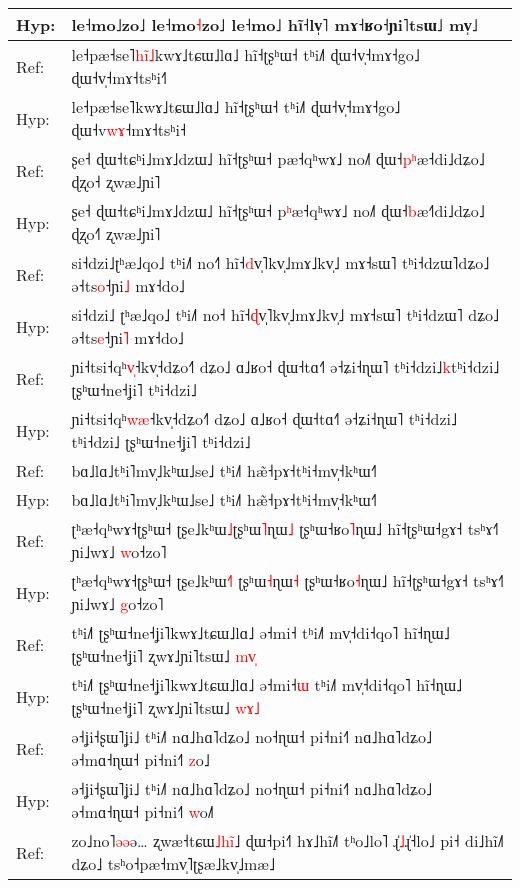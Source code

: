 \documentclass[10pt]{article}
\DeclareRobustCommand{\hl}[1]{{\textcolor{red}{#1}}}
\begin{document}
\begin{longtable}{ll}
Hyp: & le˧mo˩zo˩ le˧mo\hl{˧}zo˩ le˧mo˩ hĩ˧lv̩˥ mɤ˧ʁo˧ɲi˥tsɯ˩ mv̩˩ \\ 
\midrule 
Ref: & le˧pæ˧se˥\hl{h}\hl{i}\hl{̃}\hl{˩}kwɤ˩tɕɯ˩lɑ˩ hĩ˧ʈʂʰɯ˧ tʰi˩˥ ɖɯ˧v̩˧mɤ˧go˩ ɖɯ˧v\hl{̩}˧mɤ˧tsʰi˧\hl{˥} \\ 
Hyp: & le˧pæ˧se˥kwɤ˩tɕɯ˩lɑ˩ hĩ˧ʈʂʰɯ˧ tʰi˩˥ ɖɯ˧v̩˧mɤ˧go˩ ɖɯ˧v\hl{w}\hl{ɤ}˧mɤ˧tsʰi˧ \\ 
\midrule 
Ref: & ʂe˧ ɖɯ˧tɕʰi˩mɤ˩dzɯ˩ hĩ˧ʈʂʰɯ˧ pæ˧qʰwɤ˩ no˩˥ ɖɯ˧\hl{p}\hl{ʰ}æ˧di˩dʑo˩ ɖʐo˧ ʐwæ˩ɲi˥ \\ 
Hyp: & ʂe˧ ɖɯ˧tɕʰi˩mɤ˩dzɯ˩ hĩ˧ʈʂʰɯ˧ p\hl{ʰ}æ˧qʰwɤ˩ no˩˥ ɖɯ˧\hl{b}æ˧\hl{˥}di˩dʑo˩ ɖʐo˧\hl{˥} ʐwæ˩ɲi˥ \\ 
\midrule 
Ref: & si˧dzi˩ʈʰæ˩qo˩ tʰi˩˥ no˧\hl{˥} hĩ˧\hl{d}v̩˥kv̩˩mɤ˩kv̩˩ mɤ˧sɯ˥ tʰi˧dzɯ˥dʑo˩ ə˧ts\hl{o}˧ɲi\hl{˩} mɤ˧do˩ \\ 
Hyp: & si˧dzi˩\hl{ }ʈʰæ˩qo˩ tʰi˩˥ no˧ hĩ˧\hl{ɖ}v̩˥kv̩˩mɤ˩kv̩˩ mɤ˧sɯ˥ tʰi˧dzɯ˥\hl{ }dʑo˩ ə˧ts\hl{e}˧ɲi\hl{˥} mɤ˧do˩ \\ 
\midrule 
Ref: & ɲi˧tsi˧qʰ\hl{v}\hl{̩}˧kv̩˧dʑo˧˥ dʑo˩ ɑ˩ʁo˧ ɖɯ˧tɑ˧˥ ə˧ʑi˧ɳɯ˥ tʰi˧dzi˩\hl{k}tʰi˧dzi˩ ʈʂʰɯ˧ne˧ʝi˥ tʰi˧dzi˩ \\ 
Hyp: & ɲi˧tsi˧qʰ\hl{w}\hl{æ}˧kv̩˧dʑo˧˥ dʑo˩ ɑ˩ʁo˧ ɖɯ˧tɑ˧˥ ə˧ʑi˧ɳɯ˥ tʰi˧dzi˩\hl{ }tʰi˧dzi˩ ʈʂʰɯ˧ne˧ʝi˥ tʰi˧dzi˩ \\ 
\midrule 
Ref: & bɑ˩lɑ˩tʰi˥mv̩˩kʰɯ˩se˩ tʰi˩˥ hæ̃˧pɤ˧tʰi˧mv̩˧kʰɯ˧˥ \\ 
Hyp: & bɑ˩lɑ˩tʰi˥mv̩˩kʰɯ˩se˩ tʰi˩˥ hæ̃˧pɤ˧tʰi˧mv̩˧kʰɯ˧˥ \\ 
\midrule 
Ref: & ʈʰæ˧qʰwɤ˧ʈʂʰɯ˧ ʈʂe˩kʰɯ\hl{˩}ʈʂʰɯ\hl{˥}ɳɯ\hl{˩} ʈʂʰɯ˧ʁo\hl{˥}ɳɯ˩ hĩ˧ʈʂʰɯ˧gɤ˧ tsʰɤ˧˥ ɲi˩wɤ˩ \hl{w}o˧zo˥ \\ 
Hyp: & ʈʰæ˧qʰwɤ˧ʈʂʰɯ˧ ʈʂe˩kʰɯ\hl{˧}\hl{˥}\hl{ }ʈʂʰɯ\hl{˧}ɳɯ\hl{˧} ʈʂʰɯ˧ʁo\hl{˧}ɳɯ˩ hĩ˧ʈʂʰɯ˧gɤ˧ tsʰɤ˧˥ ɲi˩wɤ˩ \hl{g}o˧zo˥ \\ 
\midrule 
Ref: & tʰi˩˥ ʈʂʰɯ˧ne˧ʝi˥kwɤ˩tɕɯ˩lɑ˩ ə˧mi˧ tʰi˩˥ mv̩˧di˧qo˥ hĩ˧ɳɯ˩ ʈʂʰɯ˧ne˧ʝi˥ ʐwɤ˩ɲi˥tsɯ˩ \hl{m}\hl{v}\hl{̩} \\ 
Hyp: & tʰi˩˥ ʈʂʰɯ˧ne˧ʝi˥kwɤ˩tɕɯ˩lɑ˩ ə˧mi˧\hl{ɯ} tʰi˩˥ mv̩˧di˧qo˥ hĩ˧ɳɯ˩ ʈʂʰɯ˧ne˧ʝi˥ ʐwɤ˩ɲi˥tsɯ˩ \hl{w}\hl{ɤ}\hl{˩} \\ 
\midrule 
Ref: & ə˧ʝi˧ʂɯ˥ʝi˩ tʰi˩˥ nɑ˩hɑ˥dʑo˩ no˧ɳɯ˧ pi˧ni˧˥ nɑ˩hɑ˥dʑo˩ ə˧mɑ˧ɳɯ˧ pi˧ni˧˥ \hl{z}o˩ \\ 
Hyp: & ə˧ʝi˧ʂɯ˥ʝi˩ tʰi˩˥ nɑ˩hɑ˥dʑo˩ no˧ɳɯ˧ pi˧ni˧˥ nɑ˩hɑ˥dʑo˩ ə˧mɑ˧ɳɯ˧ pi˧ni˧˥ \hl{w}o˩\hl{˥} \\ 
\midrule 
Ref: & zo˩no˥\hl{ə}\hl{ə}ə… ʐwæ˧tɕɯ\hl{˩}\hl{h}\hl{i}\hl{̃}˩ ɖɯ˧pi˧˥ hɤ˩hĩ˩˥ tʰo˩lo˥ ɻ̍\hl{˩}ɻ̍˧lo˩ pi˧ di˩hĩ˩\hl{˥}\hl{ }dʑo˩ tsʰo˧pæ˧mv̩˥ʈʂæ˩kv̩˩mæ˩ \\ 

\end{longtable}
\end{document}
